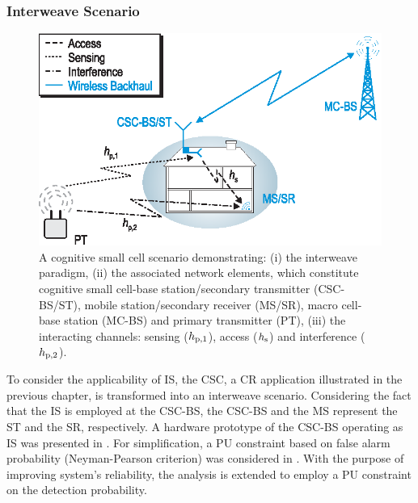 \subsubsection{Interweave Scenario}
\begin{figure}[!ht]
\centering
\includegraphics[width = \figscale]{figures/CR_Scenario_Interweave}
\caption{A cognitive small cell scenario demonstrating: (i) the interweave paradigm, (ii) the associated network elements, which constitute cognitive small cell-base station/secondary transmitter (CSC-BS/ST), mobile station/secondary receiver (MS/SR), macro cell-base station (MC-BS) and primary transmitter (PT), (iii) the interacting channels: sensing ($h_{\text{p,1}}$), access ($h_{\text{s}}$) and interference ($h_{\text{p,2}}$).}
\label{fig_IS:scenario}
\end{figure}

To consider the applicability of IS, the CSC, a CR application illustrated in the previous chapter, is transformed into an interweave scenario. Considering the fact that the IS is employed at the CSC-BS, the CSC-BS and the MS represent the ST and the SR, respectively. A hardware prototype of the CSC-BS operating as IS was presented in \cite{Kaushik13}. For simplification, a PU constraint based on false alarm probability (Neyman-Pearson criterion) was considered in \cite{Kaushik13}. With the purpose of improving system's reliability, the analysis is extended to employ a PU constraint on the detection probability.

